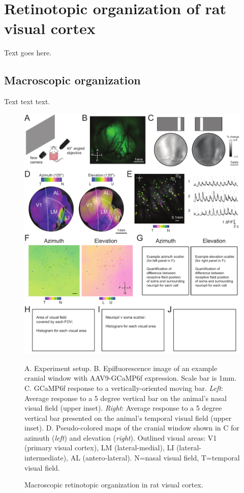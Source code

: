 \documentclass{article}
\begin{document}
\section{Retinotopic organization of rat visual cortex}
\label{sec:retinotopy}

Text goes here.

\subsection{Macroscopic organization}
Text text text.

\begin{figure}[ht]
  \includegraphics[width=\textwidth]{figures/retino.pdf}
  \caption{Macroscopic retinotopic organization in rat visual cortex.}
  \medskip
  \small
  A.  Experiment setup.  
  B.  Epifluorescence image of an example cranial window with AAV9-GCaMP6f expression. Scale bar is 1mm.  
  C.  GCaMP6f response to a vertically-oriented moving bar. \textit{Left}: Average response to a 5 degree vertical bar on the animal’s nasal visual field (upper inset). \textit{Right}: Average response to a 5 degree vertical bar presented on the animal’s temporal visual field (upper inset). 
  D.  Pseudo-colored maps of the cranial window shown in C for azimuth (\textit{left}) and elevation (\textit{right}). Outlined visual areas:  V1 (primary visual cortex), LM (lateral-medial), LI (lateral-intermediate), AL (antero-lateral). N=nasal visual field, T=temporal visual field. 

\end{figure}
\end{document}
